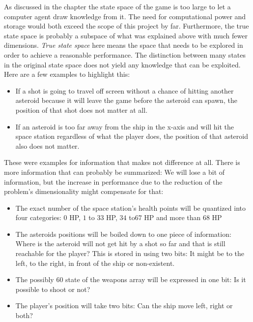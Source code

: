 \documentclass[a4paper,10pt]{article}
\begin{document}
As discussed in the chapter  the state space of the game is too large to let a computer agent draw knowledge from it.
The need for computational power and storage would both exceed the scope of this project by far.
Furthermore, the true state space is probably a subspace of what was explained above with much fewer dimensions.
\emph{True state space} here means the space that needs to be explored in order to achieve a reasonable performance. 
The distinction between many states in the original state space does not yield any knowledge that can be exploited.
Here are a few examples to highlight this:
\begin{itemize}
 \item If a shot is going to travel off screen without a chance of hitting another asteroid because it will leave the game before the asteroid can spawn, the position of that shot does not matter at all.
 \item If an asteroid is too far away from the ship in the x-axis and will hit the space station regardless of what the player does, the position of that asteroid also does not matter.
\end{itemize}
These were examples for information that makes not difference at all.
There is more information that can probably be summarized: We will lose a bit of information, but the increase in performance due to the reduction of the problem's dimensionality might compensate for that:
\begin{itemize}
 \item The exact number of the space station's health points will be quantized into four categories: $0$ HP, $1$ to $33$ HP, $34$ to$ 67$ HP and more than $68$ HP
 \item The asteroids positions will be boiled down to one piece of information: Where is the asteroid will not get hit by a shot so far and that is still reachable for the player? 
 This is stored in using two bits: It might be to the left, to the right, in front of the ship or non-existent.
 \item The possibly $60$ state of the weapons array will be expressed in one bit: Is it possible to shoot or not?
 \item The player's position will take two bits: Can the ship move left, right or both?
\end{itemize}
\end{document}
